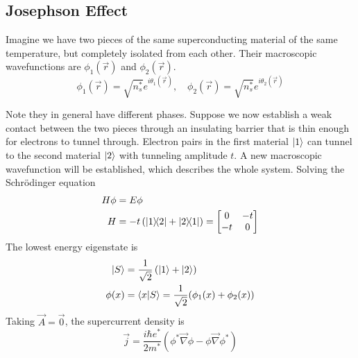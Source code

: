 \documentclass[12pt,a4paper,titlepage]{article}
\begin{document}
\subsection{Josephson Effect}
Imagine we have two pieces of the same superconducting material of the same temperature, but completely isolated from each other. Their macroscopic wavefunctions are $\phi_{1}(\vec{r})$ and $\phi_{2}(\vec{r})$.
\begin{equation}
\phi_{1}(\vec{r})=\sqrt{n_{s}^{*}}e^{i\theta_{1}(\vec{r})},\quad\phi_{2}(\vec{r})=\sqrt{n_{s}^{*}}e^{i\theta_{2}(\vec{r})}
\end{equation}
\begin{center}
\end{center}
Note they in general have different phases. Suppose we now establish a weak contact between the two pieces through an insulating barrier that is thin enough for electrons to tunnel through. Electron pairs in the first material $\ket{1}$ can tunnel to the second material $\ket{2}$ with tunneling amplitude $t$. A new macroscopic wavefunction will be established, which describes the whole system. Solving the Schr\"{o}dinger equation
\begin{equation}
\begin{aligned}
H\phi&=E\phi\\
H&=-t\left(\ketbra{1}{2}+\ketbra{2}{1}\right)=\begin{bmatrix}
0 & -t\\
-t & 0
\end{bmatrix}
\end{aligned}
\end{equation}
The lowest energy eigenstate is
\begin{equation}
\begin{aligned}
\ket{S}&=\frac{1}{\sqrt{2}}\left(\ket{1}+\ket{2}\right)\\
\phi(x)&=\braket{x}{S}=\frac{1}{\sqrt{2}}(\phi_{1}(x)+\phi_{2}(x))
\end{aligned}
\end{equation}
Taking $\vec{A}=\vec{0}$, the supercurrent density is
\begin{equation}
\vec{j}=\frac{i\hbar e^{*}}{2m^{*}}(\phi^{*}\vec{\nabla}\phi-\phi\vec{\nabla}\phi^{*})
\end{equation}
\end{document}
